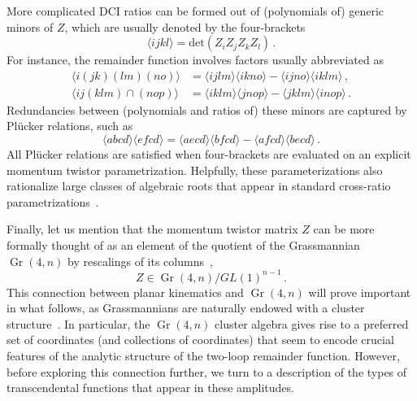 \documentclass[11pt]{article}
\DeclareMathOperator{\Gr}{Gr}
\def\ket#1{\langle #1 \rangle}
\begin{document}
More complicated DCI ratios can be formed out of (polynomials of) generic minors of $Z$, which are usually denoted by the four-brackets
\begin{equation} \label{eq:four_bracket_def}
\langle i j k l \rangle = \text{det}(Z_i Z_j Z_k Z_l) \, .
\end{equation}
For instance, the remainder function involves factors usually abbreviated as 
\begin{align}
\langle i (j k)( l m) (n o)\rangle &= 
\langle i j l m \rangle \langle i k n o \rangle - \langle i j n o\rangle \langle i k l m \rangle \, , \label{eq:abbrev_1} \\
\langle i j (k l m) \cap (n o p) \rangle &= 
 \langle i k l m \rangle \langle j n o p \rangle - \langle j k l m \rangle \langle i n o p \rangle \, . \label{eq:abbrev_2}
\end{align} 
Redundancies between (polynomials and ratios of) these minors are captured by Pl\"ucker relations, such as
\begin{equation}
  \label{eq:plucker-rel}
  \ket{abcd} \ket{efcd} = \ket{aecd} \ket{bfcd} - \ket{afcd}\ket{becd} \, .
\end{equation}
All Pl\"ucker relations are satisfied when four-brackets are evaluated on an explicit momentum twistor parametrization. Helpfully, these parameterizations also rationalize large classes of algebraic roots that appear in standard cross-ratio parametrizations~\cite{Bourjaily:2018aeq}. 


Finally, let us mention that the momentum twistor matrix $Z$ can be more formally thought of as an element of the quotient of the Grassmannian $\Gr(4,n)$ by rescalings of its columns~\cite{ArkaniHamed:2012nw},
\begin{equation}
Z \in \Gr(4,n)/GL(1)^{n-1} \, .
\end{equation}
This connection between planar kinematics and $\Gr(4,n)$ will prove important in what follows, as Grassmannians are naturally endowed with a cluster structure~\cite{1021.16017,Golden:2013xva}. In particular, the $\Gr(4,n)$ cluster algebra gives rise to a preferred set of  coordinates (and collections of coordinates) that seem to encode crucial features of the analytic structure of the two-loop remainder function. However, before exploring this connection further, we turn to a description of the types of transcendental functions that appear in these amplitudes.
\end{document}
